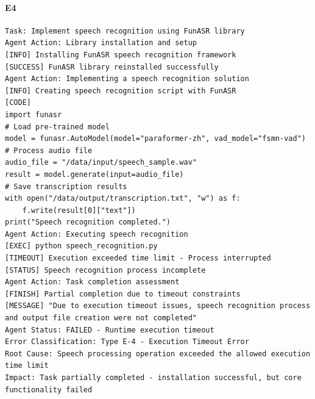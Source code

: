 \paragraph{E4}
\begin{lstlisting}[language={},caption={FunASR speech recognition task terminated due to execution timeout.},label={lst:funasr-timeout}]
Task: Implement speech recognition using FunASR library
Agent Action: Library installation and setup
[INFO] Installing FunASR speech recognition framework
[SUCCESS] FunASR library reinstalled successfully
Agent Action: Implementing a speech recognition solution
[INFO] Creating speech recognition script with FunASR
[CODE] 
import funasr
# Load pre-trained model
model = funasr.AutoModel(model="paraformer-zh", vad_model="fsmn-vad")
# Process audio file
audio_file = "/data/input/speech_sample.wav"
result = model.generate(input=audio_file)
# Save transcription results
with open("/data/output/transcription.txt", "w") as f:
    f.write(result[0]["text"])
print("Speech recognition completed.")
Agent Action: Executing speech recognition
[EXEC] python speech_recognition.py
[TIMEOUT] Execution exceeded time limit - Process interrupted
[STATUS] Speech recognition process incomplete
Agent Action: Task completion assessment
[FINISH] Partial completion due to timeout constraints
[MESSAGE] "Due to execution timeout issues, speech recognition process and output file creation were not completed"
Agent Status: FAILED - Runtime execution timeout
Error Classification: Type E-4 - Execution Timeout Error
Root Cause: Speech processing operation exceeded the allowed execution time limit
Impact: Task partially completed - installation successful, but core functionality failed
\end{lstlisting}

